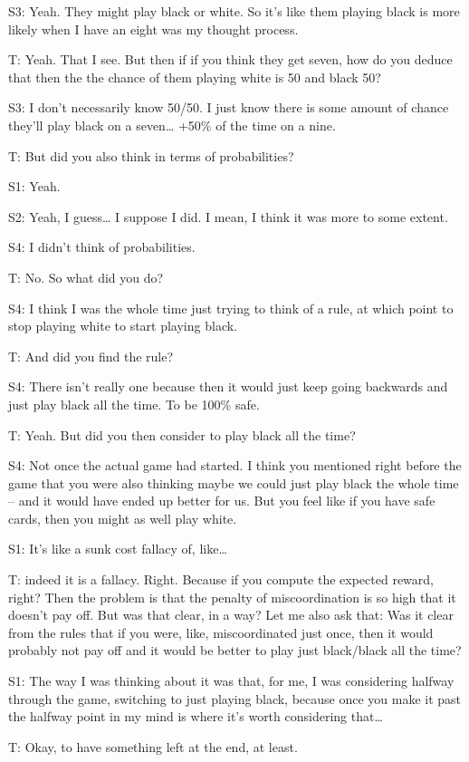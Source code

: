 S3: Yeah. They might play black or white. So it's like them playing black is more likely when I have an eight was my thought process.

T: Yeah. That I see. But then if if you think they get seven, how do you deduce that then the the chance of them playing white is 50 and black 50? 

S3: I don't necessarily know 50/50. I just know there is some amount of chance they'll play black on a seven… +50\% of the time on a nine.

T: But did you also think in terms of probabilities? 

S1: Yeah.

S2: Yeah, I guess… I suppose I did. I mean, I think it was more to some extent. 

S4: I didn't think of probabilities. 

T: No. So what did you do? 

S4: I think I was the whole time just trying to think of a rule, at which point to stop playing white to start playing black.

T: And did you find the rule? 

S4: There isn't really one because then it would just keep going backwards and just play black all the time. To be 100\% safe. 

T: Yeah. But did you then consider to play black all the time? 

S4: Not once the actual game had started. I think you mentioned right before the game that you were also thinking maybe we could just play black the whole time – and it would have ended up better for us. But you feel like if you have safe cards, then you might as well play white. 

S1: It's like a sunk cost fallacy of, like… 

T: indeed it is a fallacy. Right. Because if you compute the expected reward, right? Then the problem is that the penalty of miscoordination is so high that it doesn't pay off. But was that clear, in a way? Let me also ask that: Was it clear from the rules that if you were, like, miscoordinated just once, then it would probably not pay off and it would be better to play just black/black all the time? 

S1: The way I was thinking about it was that, for me, I was considering halfway through the game, switching to just playing black, because once you make it past the halfway point in my mind is where it's worth considering that…

T: Okay, to have something left at the end, at least. 

